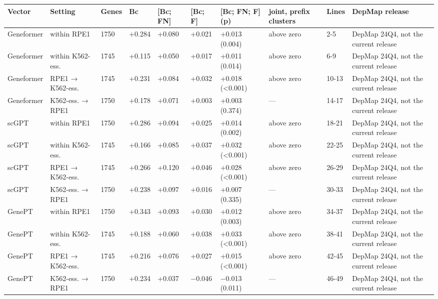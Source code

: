 \begin{tabular}{llllllllll}
\toprule
Vector & Setting & Genes & Bc & [Bc; FN] & [Bc; F] & [Bc; FN; F] (p) & joint, prefix clusters & Lines & DepMap release \\
\midrule
Geneformer & within RPE1 & 1750 & +0.284 & +0.080 & +0.021 & +0.013 (0.004) & above zero & 2-5 & DepMap 24Q4, not the current release \\
Geneformer & within K562-ess. & 1745 & +0.115 & +0.050 & +0.017 & +0.011 (0.014) & above zero & 6-9 & DepMap 24Q4, not the current release \\
Geneformer & RPE1 → K562-ess. & 1745 & +0.231 & +0.084 & +0.032 & +0.018 (<0.001) & above zero & 10-13 & DepMap 24Q4, not the current release \\
Geneformer & K562-ess. → RPE1 & 1750 & +0.178 & +0.071 & +0.003 & +0.003 (0.374) & — & 14-17 & DepMap 24Q4, not the current release \\
scGPT & within RPE1 & 1750 & +0.286 & +0.094 & +0.025 & +0.014 (0.002) & above zero & 18-21 & DepMap 24Q4, not the current release \\
scGPT & within K562-ess. & 1745 & +0.166 & +0.085 & +0.037 & +0.032 (<0.001) & above zero & 22-25 & DepMap 24Q4, not the current release \\
scGPT & RPE1 → K562-ess. & 1745 & +0.266 & +0.120 & +0.046 & +0.028 (<0.001) & above zero & 26-29 & DepMap 24Q4, not the current release \\
scGPT & K562-ess. → RPE1 & 1750 & +0.238 & +0.097 & +0.016 & +0.007 (0.335) & — & 30-33 & DepMap 24Q4, not the current release \\
GenePT & within RPE1 & 1750 & +0.343 & +0.093 & +0.030 & +0.012 (0.003) & above zero & 34-37 & DepMap 24Q4, not the current release \\
GenePT & within K562-ess. & 1745 & +0.188 & +0.060 & +0.038 & +0.033 (<0.001) & above zero & 38-41 & DepMap 24Q4, not the current release \\
GenePT & RPE1 → K562-ess. & 1745 & +0.216 & +0.076 & +0.027 & +0.015 (<0.001) & above zero & 42-45 & DepMap 24Q4, not the current release \\
GenePT & K562-ess. → RPE1 & 1750 & +0.234 & +0.037 & −0.046 & −0.013 (0.011) & — & 46-49 & DepMap 24Q4, not the current release \\
\bottomrule
\end{tabular}

